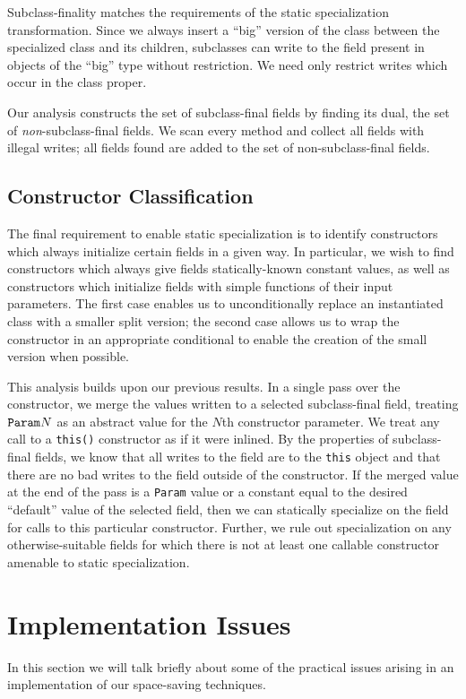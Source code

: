 \documentclass{acmconf}
\begin{document}
Subclass-finality matches the requirements of the static
specialization transformation.  Since we always insert a ``big''
version of the class between the specialized class and its children,
subclasses can write to the field present in objects of the ``big'' type
without restriction.
We need only restrict writes which occur in the class proper.

Our analysis constructs the set of subclass-final fields by finding
its dual, the set of {\it non}-subclass-final fields.  We scan every
method and collect all fields with illegal writes; all
fields found are added to the set of non-subclass-final fields.

\subsection{Constructor Classification}
The final requirement to enable static specialization is to identify
constructors which always initialize certain fields in a given way.
In particular, we wish to find constructors which always give fields
statically-known constant values, as well as constructors which
initialize fields with simple functions of their input parameters.
The first case enables us to unconditionally replace an instantiated
class with a smaller split version; the second case allows us to wrap
the constructor in an appropriate conditional to enable the creation
of the small version when possible.

This analysis builds upon our previous results.
In a single pass over the constructor, we merge the values written
to a selected subclass-final field, treating $\text{\tt Param}N$ as an
abstract value for the $N$th constructor parameter.
We treat any call to a {\tt this()}
constructor as if it were inlined.  By the properties of
subclass-final fields, we know that all writes to the
field are to the {\tt this} object and that there are no bad writes to
the field outside of the constructor.
If the merged value at the end of the pass 
is a {\tt Param} value or a constant equal to the desired ``default''
value of the selected field,
then we can statically specialize on the field for calls to this
particular constructor.
Further, we rule out specialization on any otherwise-suitable
fields for which there is not at least one callable constructor
amenable to static specialization.
%
\section{Implementation Issues}
%
In this section we will talk briefly about some of the practical
issues arising in an implementation of our space-saving techniques.
%
\end{document}
